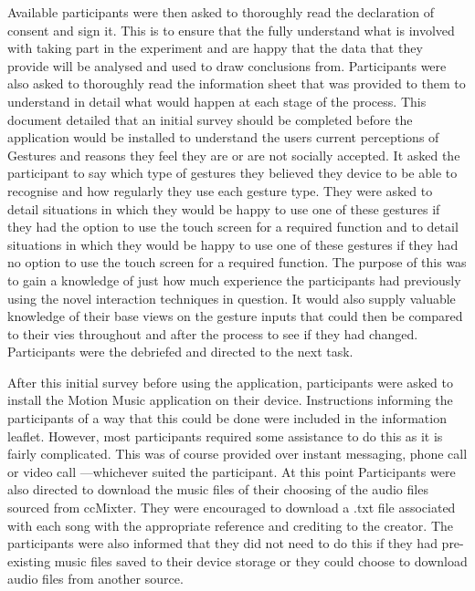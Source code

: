 \documentclass{l4proj}
\begin{document}
Available participants were then asked to thoroughly read the declaration of consent and sign it. This is to ensure that the fully understand what is involved with taking part in the experiment and are happy that the data that they provide will be analysed and used to draw conclusions from. Participants were also asked to thoroughly read the information sheet that was provided to them to understand in detail what would happen at each stage of the process. This document detailed that an initial survey should be completed before the application would be installed to understand the users current perceptions of Gestures and reasons they feel they are or are not socially accepted. It asked the participant to say which type of gestures they believed they device to be able to recognise and how regularly they use each gesture type. They were asked to detail situations in which they would be happy to use one of these gestures if they had the option to use the touch screen for a required function and to detail situations in which they would be happy to use one of these gestures if they had no option to use the touch screen for a required function. The purpose of this was to gain a knowledge of just how much experience the participants had previously using the novel interaction techniques in question. It would also supply valuable knowledge of their base views on the gesture inputs that could then be compared to their vies throughout and after the process to see if they had changed.
Participants were the debriefed and directed to the next task.

After this initial survey before using the application, participants were asked to install the Motion Music application on their device. Instructions informing the participants of a way that this could be done were included in the information leaflet. However, most participants required some assistance to do this as it is fairly complicated. This was of course provided over instant messaging, phone call or video call ---whichever suited the participant. At this point Participants were also directed to download the music files of their choosing of the audio files sourced from ccMixter. They were encouraged to download a .txt file associated with each song with the appropriate reference and crediting to the creator. The participants were also informed that they did not need to do this if they had pre-existing music files saved to their device storage or they could choose to download audio files from another source.
\end{document}
